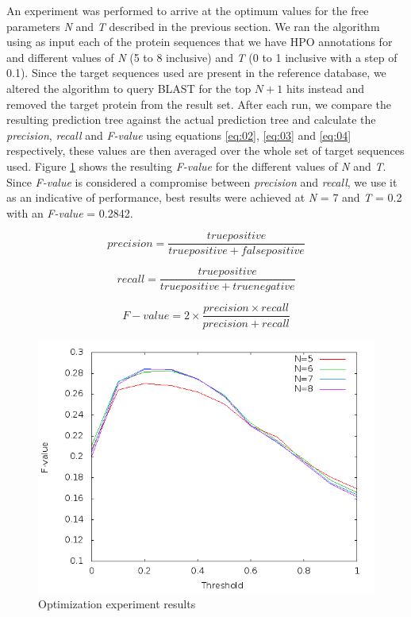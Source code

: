 \documentclass{bioinfo}
\begin{document}
An experiment was performed to arrive at the optimum values for the free parameters \textit{N} and \textit{T} described in the previous section. We ran the algorithm using as input each of the protein sequences that we have HPO annotations for and different values of \textit{N} (5 to 8 inclusive) and \textit{T} (0 to 1 inclusive with a step of 0.1). Since the target sequences used are present in the reference database, we altered the algorithm to query BLAST for the top $N + 1$ hits instead and removed the target protein from the result set. After each run, we compare the resulting prediction tree against the actual prediction tree and calculate the \textit{precision}, \textit{recall} and \textit{F-value} using equations \ref{eq:02}, \ref{eq:03} and \ref{eq:04} respectively, these values are then averaged over the whole set of target sequences used. Figure \ref{optim} shows the resulting \textit{F-value} for the different values of \textit{N} and \textit{T}. Since \textit{F-value} is considered a compromise between \textit{precision} and \textit{recall}, we use it as an indicative of performance, best results were achieved at \textit{N} = 7 and \textit{T} = 0.2 with an \textit{F-value} = 0.2842.

\begin{equation}
precision = \frac{true positive}{true positive + false positive}
\label{eq:02}
\end{equation}

\begin{equation}
recall = \frac{true positive}{true positive + true negative}
\label{eq:03}
\end{equation}

\begin{equation}
F-value = 2\times\frac{precision \times recall}{precision + recall}
\label{eq:04}
\end{equation}

\begin{figure}[!tpb]
\centerline{\includegraphics[scale=0.4]{bilder/optim.png}}
\caption{Optimization experiment results}
\label{optim}
\end{figure}
\end{document}
